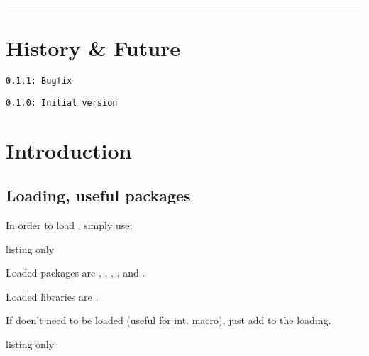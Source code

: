 \documentclass[11pt,a4paper]{ltxdoc}
\begin{document}
%

%

\hrule

\vspace*{5mm}

\pagebreak


\hypertarget{matoc}{}

\tableofcontents

\vspace*{5mm}

\vfill

\section{History \& Future}

\texttt{0.1.1: Bugfix}

\texttt{0.1.0: Initial version}

\vspace*{5mm}


\pagebreak

\section{Introduction}

\subsection{Loading, useful packages}

In order to load , simply use:

\begin{DemoCode}{listing only}
\usepackage{timeop}
\end{DemoCode}

Loaded packages are , , , ,  and .

Loaded libraries are .

\smallskip

If  doen't need to be loaded (useful for int. macro), just add \ShowCode{[noamssymb]} to the loading.

\begin{DemoCode}{listing only}
\usepackage[noamsmath]{timeop}
\end{DemoCode}
\end{document}
